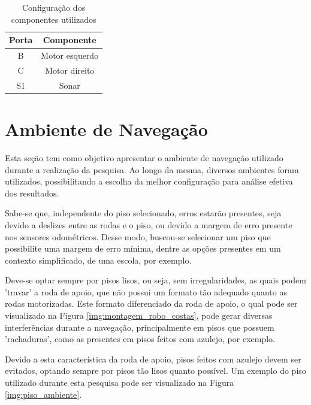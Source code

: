 	\begin{table}[H]
		\centering
		\caption{Configuração dos componentes utilizados}
		\label{tab:portas_motores_sensores}
		\begin{tabular}{|c|c|}
		\hline
		\textbf{Porta} & \textbf{Componente} \\ \hline
		B              & Motor esquerdo      \\ \hline
		C              & Motor direito       \\ \hline
		S1             & Sonar               \\ \hline
		\end{tabular}
	\end{table}

\section{Ambiente de Navegação}

	Esta seção tem como objetivo apresentar o ambiente de navegação utilizado durante a realização da pesquisa. Ao longo da mesma, diversos ambientes foram utilizados, possibilitando a escolha da melhor configuração para análise efetiva dos resultados.

	Sabe-se que, independente do piso selecionado, erros estarão presentes, seja devido a deslizes entre as rodas e o piso, ou devido a margem de erro presente nos sensores odométricos. Desse modo, buscou-se selecionar um piso que possibilite uma margem de erro mínima, dentre as opções presentes em um contexto simplificado, de uma escola, por exemplo.

	Deve-se optar sempre por pisos lisos, ou seja, sem irregularidades, as quais podem 'travar' a roda de apoio, que não possui um formato tão adequado quanto as rodas motorizadas. Este formato diferenciado da roda de apoio, o qual pode ser visualizado na Figura \ref{img:montagem_robo_costas}, pode gerar diversas interferências durante a navegação, principalmente em pisos que possuem 'rachaduras', como as presentes em pisos feitos com azulejo, por exemplo.

	Devido a esta característica da roda de apoio, pisos feitos com azulejo devem ser evitados, optando sempre por pisos tão lisos quanto possível. Um exemplo do piso utilizado durante esta pesquisa pode ser visualizado na Figura \ref{img:piso_ambiente}.

